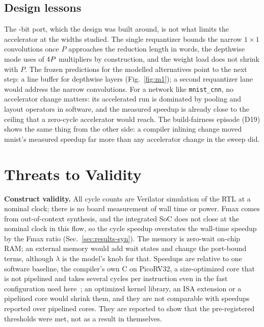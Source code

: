 \documentclass[journal]{IEEEtran}
\begin{document}
\subsection{Design lessons}
The \PortBits-bit port, which the design was built around, is not what limits the accelerator at the widths studied. The single requantizer bounds the narrow $1\times1$ convolutions once $P$ approaches the reduction length in words, the depthwise mode uses \Lanes{} of $4 P$ multipliers by construction, and the weight load does not shrink with $P$. The frozen predictions for the modelled alternatives point to the next step: a line buffer for depthwise layers (Fig.~\ref{fig:m1}); a second requantizer lane would address the narrow convolutions. For a network like \texttt{mnist\_cnn}, no accelerator change matters: its accelerated run is dominated by pooling and layout operators in software, and the measured speedup is already close to the ceiling that a zero-cycle accelerator would reach. The build-fairness episode (D19) shows the same thing from the other side: a compiler inlining change moved mnist's measured speedup far more than any accelerator change in the sweep did.

\section{Threats to Validity}\label{sec:threats}
\textbf{Construct validity.} All cycle counts are Verilator simulation of the RTL at a nominal clock; there is no board measurement of wall time or power. Fmax comes from out-of-context synthesis, and the integrated SoC does not close at the nominal clock in this flow, so the cycle speedup overstates the wall-time speedup by the Fmax ratio (Sec.~\ref{sec:results-syn}). The memory is zero-wait on-chip RAM; an external memory would add wait states and change the port-bound terms, although $\lambda$ is the model's knob for that. Speedups are relative to one software baseline, the compiler's own C on PicoRV32, a size-optimized core that is not pipelined and takes several cycles per instruction even in the fast configuration used here~\cite{picorv32}; an optimized kernel library, an ISA extension or a pipelined core would shrink them, and they are not comparable with speedups reported over pipelined cores. They are reported to show that the pre-registered thresholds were met, not as a result in themselves.
\end{document}
